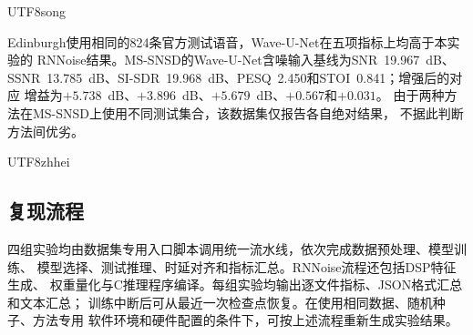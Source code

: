 \documentclass[10.5pt,compsoc]{CjC}
\theoremstyle{mystyle}
\begin{document}
\begin{CJK*}{UTF8}{song}
\begin{table}[htbp]
\centering
\caption{不同语音增强方法在Edinburgh和MS-SNSD上的客观评价结果}
\label{tab:method-comparison}
\vspace{1mm}
{
\renewcommand{\arraystretch}{1.25}
\setlength{\tabcolsep}{3pt}
}
\end{table}

Edinburgh使用相同的824条官方测试语音，Wave-U-Net在五项指标上均高于本实验的
RNNoise结果。MS-SNSD的Wave-U-Net含噪输入基线为SNR~19.967~dB、
SSNR~13.785~dB、SI-SDR~19.968~dB、PESQ~2.450和STOI~0.841；增强后的对应
增益为$+5.738$~dB、$+3.896$~dB、$+5.679$~dB、$+0.567$和$+0.031$。
由于两种方法在MS-SNSD上使用不同测试集合，该数据集仅报告各自绝对结果，
不据此判断方法间优劣。

{\begin{CJK*}{UTF8}{zhhei}\subsection{复现流程}\end{CJK*}}
\label{subsec:reproducibility}

四组实验均由数据集专用入口脚本调用统一流水线，依次完成数据预处理、模型训练、
模型选择、测试推理、时延对齐和指标汇总。RNNoise流程还包括DSP特征生成、
权重量化与C推理程序编译。每组实验均输出逐文件指标、JSON格式汇总和文本汇总；
训练中断后可从最近一次检查点恢复。在使用相同数据、随机种子、方法专用
软件环境和硬件配置的条件下，可按上述流程重新生成实验结果。
\end{CJK*}
\end{document}
